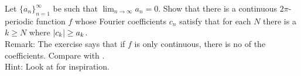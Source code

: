 \begin{exercise}
Let
$\{ a_n \}_{n=1}^\infty$ be such that 
$\lim_{n\to \infty} a_n = 0$.  Show that there is a continuous
$2\pi$-periodic function $f$ whose Fourier coefficients
$c_{n}$
satisfy that for each $N$ there is a $k \geq N$ where $\lvert {c_k} \rvert \geq
a_k$.\\
Remark: The exercise says that if $f$ is only continuous, there is
no  of the coefficients.  Compare with
.
\\
Hint: Look at  for inspiration.
\end{exercise}
